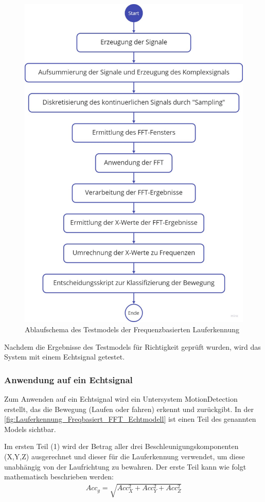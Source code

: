\begin{figure}
	\centering
	\includegraphics[width=0.7\linewidth]{Bilder/Ablaufschema_Freq_Lauferkennung.pdf}  %
	\caption{Ablaufschema des Testmodels der Frequenzbasierten Lauferkennung}
	\label{fig:Lauferkennung_FFT_Ablaufschema_Testmodell}
\end{figure}

Nachdem die Ergebnisse des Testmodels für Richtigkeit geprüft wurden, wird das System mit einem Echtsignal getestet. 

\subsubsection{Anwendung auf ein Echtsignal}

Zum Anwenden auf ein Echtsignal wird ein Untersystem \glqq MotionDetection\grqq{} erstellt, das die Bewegung (Laufen oder fahren) erkennt und zurückgibt.
In der \autoref{fig:Lauferkennung_Freqbasiert_FFT_Echtmodell} ist einen Teil des genannten Models sichtbar. 

Im ersten Teil (1) wird der Betrag aller drei Beschleunigungskomponenten (X,Y,Z) ausgerechnet und dieser für die Lauferkennung verwendet, um diese unabhängig von der Laufrichtung zu bewahren. Der erste Teil kann wie folgt mathematisch beschrieben werden:
\begin{align*}
	Acc_g = \sqrt{ Acc_X^2 + Acc_Y^2 + Acc_Z^2}
\end{align*}

